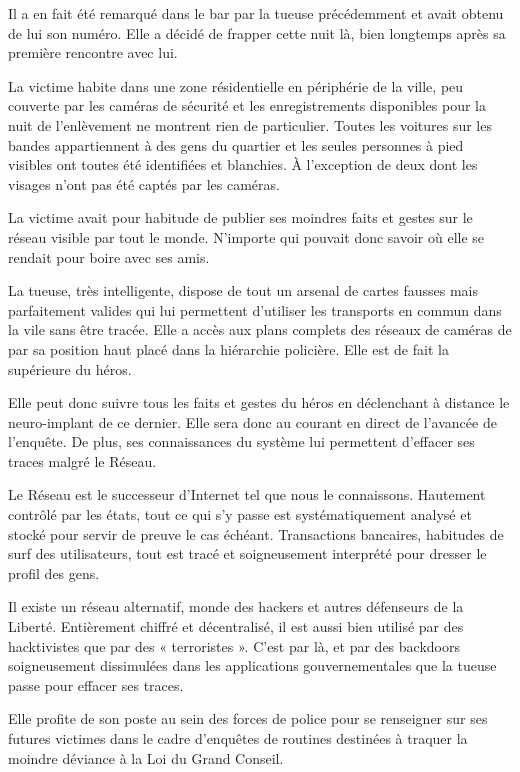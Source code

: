 Il a en fait été remarqué dans le bar par la tueuse précédemment et avait
obtenu de lui son numéro. Elle a décidé de frapper cette nuit là, bien
longtemps après sa première rencontre avec lui.

La victime habite dans une zone résidentielle en périphérie de la ville, peu
couverte par les caméras de sécurité et les enregistrements disponibles pour la
nuit de l'enlèvement ne montrent rien de particulier. Toutes les voitures sur
les bandes appartiennent à des gens du quartier et les seules personnes à pied
visibles ont toutes été identifiées et blanchies. À l'exception de deux dont
les visages n'ont pas été captés par les caméras.

La victime avait pour habitude de publier ses moindres faits et gestes sur le
réseau visible par tout le monde. N'importe qui pouvait donc savoir où elle se
rendait pour boire avec ses amis.

La tueuse, très intelligente, dispose de tout un arsenal de cartes fausses mais
parfaitement valides qui lui permettent d'utiliser les transports en commun
dans la vile sans être tracée. Elle a accès aux plans complets des réseaux de
caméras de par sa position haut placé dans la hiérarchie policière. Elle est de
fait la supérieure du héros.

Elle peut donc suivre tous les faits et gestes du héros en déclenchant à
distance le neuro-implant de ce dernier. Elle sera donc au courant en direct de
l'avancée de l'enquête. De plus, ses connaissances du système lui permettent
d'effacer ses traces malgré le Réseau.

Le Réseau est le successeur d'Internet tel que nous le connaissons. Hautement
contrôlé par les états, tout ce qui s'y passe est systématiquement analysé
et stocké pour servir de preuve le cas échéant. Transactions bancaires,
habitudes de surf des utilisateurs, tout est tracé et soigneusement interprété
pour dresser le profil des gens.

Il existe un réseau alternatif, monde des hackers et autres défenseurs de la
Liberté. Entièrement chiffré et décentralisé, il est aussi bien utilisé
par des hacktivistes que par des « terroristes ». C'est par là, et par des
backdoors soigneusement dissimulées dans les applications gouvernementales que
la tueuse passe pour effacer ses traces.

Elle profite de son poste au sein des forces de police pour se renseigner sur
ses futures victimes dans le cadre d'enquêtes de routines destinées à traquer
la moindre déviance à la Loi du Grand Conseil.


